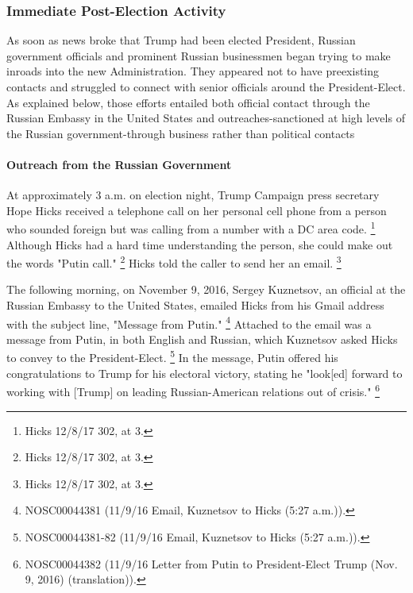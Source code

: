 \subsubsection{Immediate Post-Election Activity}

As soon as news broke that Trump had been elected President, Russian government officials and prominent Russian businessmen began trying to make inroads into the new Administration.
They appeared not to have preexisting contacts and struggled to connect with senior officials around the President-Elect.
As explained below, those efforts entailed both official contact through the Russian Embassy in the United States and outreaches-sanctioned at high levels of the Russian government-through business rather than political contacts

\paragraph{Outreach from the Russian Government}

At approximately 3 a.m. on election night, Trump Campaign press secretary Hope Hicks received a telephone call on her personal cell phone from a person who sounded foreign but was calling from a number with a DC area code.%
\footnote{Hicks 12/8/17 302, at 3.}
Although Hicks had a hard time understanding the person, she could make out the words "Putin call."%
\footnote{Hicks 12/8/17 302, at 3.}
Hicks told the caller to send her an email.%
\footnote{Hicks 12/8/17 302, at 3.}

The following morning, on November 9, 2016, Sergey Kuznetsov, an official at the Russian Embassy to the United States, emailed Hicks from his Gmail address with the subject line, "Message from Putin."%
\footnote{NOSC00044381 (11/9/16 Email, Kuznetsov to Hicks (5:27 a.m.)).}
Attached to the email was a message from Putin, in both English and Russian, which Kuznetsov asked Hicks to convey to the President-Elect.%
\footnote{NOSC00044381-82 (11/9/16 Email, Kuznetsov to Hicks (5:27 a.m.)).}
In the message, Putin offered his congratulations to Trump for his electoral victory, stating he "look[ed] forward to working with [Trump] on leading Russian-American relations out of crisis."%
\footnote{NOSC00044382 (11/9/16 Letter from Putin to President-Elect Trump (Nov. 9, 2016) (translation)).}

